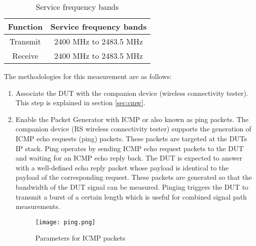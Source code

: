 \begin{table}[ht]
\begin{center}
\begin {tabular} {|c|c|} 
\toprule
Function & Service frequency bands \\ 
\midrule 
Transmit & 2400 MHz to 2483.5 MHz \\
Receive & 2400 MHz to 2483.5 MHz \\
\bottomrule
\end{tabular} 
\caption{Service frequency bands \cite{etsi300328}}
\label{tab:bands}
\end{center}
\end{table}
The methodologies for this measurement are as follows:
\begin{enumerate}
  \item Associate the \acs{DUT} with the companion device (wireless connectivity tester). This step is explained in section \ref{sec:cmw}.
   \item Enable the Packet Generator with \acf{ICMP} or also known as ping packets. The companion device (\acs{RS}\textregistered{} wireless connectivity tester) supports the generation of \acs{ICMP} echo requests (ping) packets. These packets are targeted at the \acsp{DUT} \acs{IP} stack. Ping operates by sending \acs{ICMP} echo request packets to the \acs{DUT} and waiting for an \acs{ICMP} echo reply back. The \acs{DUT} is expected to answer with a well-defined echo reply packet whose payload is identical to the payload of the corresponding request. These packets are generated so that the bandwidth of the \acs{DUT} signal can be measured. Pinging triggers the \acs{DUT} to transmit a burst of a certain length which is useful for combined signal path measurements.

\begin{figure}[H]
\centering
\texttt{[image: ping.png]}
\caption{Parameters for \acs{ICMP} packets}
\label{fig:pingping}
\end{figure}



\end{enumerate}
